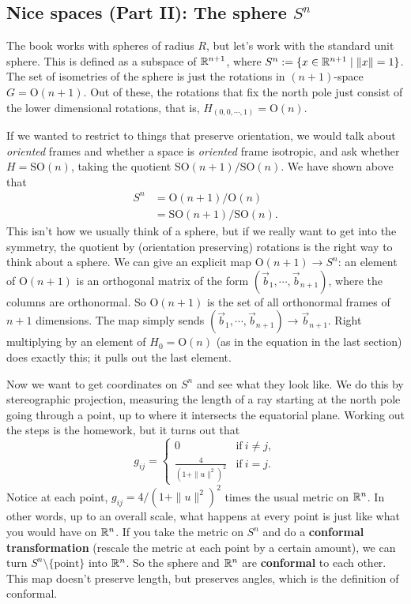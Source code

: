 \subsection{Nice spaces (Part II): The sphere $S^n $}
The book works with spheres of radius $R$, but let's work with the standard unit sphere. This is defined as a subspace of $\mathbb{R}^{n+1}$, where $S^n := \{x \in \mathbb{R}^{n+1}\mid \|x\|=1\} $. The set of isometries of the sphere is just the rotations in $(n+1)$-space $G=\mathrm O(n+1)$. Out of these, the rotations that fix the north pole just consist of the lower dimensional rotations, that is, $H_{(0,0,\cdots ,1)}=\mathrm O(n)$.

If we wanted to restrict to things that preserve orientation, we would talk about \emph{oriented} frames and whether a space is \emph{oriented} frame isotropic, and ask whether $H=\mathrm{SO} (n)$, taking the quotient $\mathrm{SO} (n+1) /\mathrm{SO} (n)$. We have shown above that 
\begin{align*}
    S^n &= \mathrm O(n+1) /\mathrm O(n)\\
        &=\mathrm{SO} (n+1) /\mathrm{SO} (n).
\end{align*}This isn't how we usually think of a sphere, but if we really want to get into the symmetry, the quotient by (orientation preserving) rotations is the right way to think about a sphere. We can give an explicit map $\mathrm O(n+1)\to S^n $: an element of $\mathrm O(n+1)$ is an orthogonal matrix of the form $(\vec{b}_1 ,\cdots ,\vec{b} _{n+1})$, where the columns are orthonormal. So $\mathrm O(n+1)$ is the set of all orthonormal frames of $n+1$ dimensions. The map simply sends $(\vec{b} _1,\cdots ,\vec b_{n+1})\to \vec b_{n+1}$. Right multiplying by an element of $H_0=\mathrm O(n)$ (as in the equation in the last section) does exactly this; it pulls out the last element.

Now we want to get coordinates on $S^n $ and see what they look like. We do this by stereographic projection, measuring the length of a ray starting at the north pole going through a point, up to where it intersects the equatorial plane. Working out the steps is the homework, but it turns out that\[
g_{ij}=
\begin{cases}
    0 \quad & \text{if} \ i\neq j,\\
    \frac{4}{(1+\|u\|^2)^2}&\text{if} \ i=j.
\end{cases}
\] Notice at each point, $g_{ij}=4 /(1+\|u\|^2)^2$ times the usual metric on $\mathbb{R}^n $. In other words, up to an overall scale, what happens at every point is just like what you would have on $\mathbb{R}^n $. If you take the metric on $S^n $ and do a \textbf{conformal transformation} (rescale the metric at each point by a certain amount), we can turn $S^n  \setminus \{\text{point}  \} $ into $\mathbb{R}^n $. So the sphere and $\mathbb{R}^n $ are \textbf{conformal} to each other. This map doesn't preserve length, but preserves angles, which is the definition of conformal.

